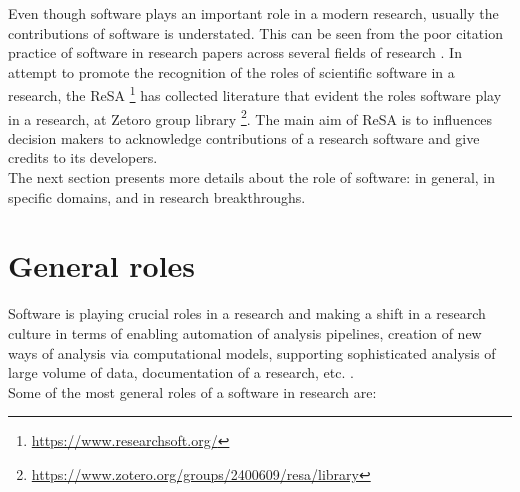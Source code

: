 Even though software plays an important role in a modern research, usually the contributions of software is understated. This can be seen from the poor citation practice of software in research papers across several fields of research \citep{schindler2021somesci,yang2018important, pan2016disciplinary}.  In attempt to promote the recognition of the roles of scientific software in a research, the \ac{ReSA} \footnote{\url{https://www.researchsoft.org/}} has collected literature that evident the roles software play in a research, at Zetoro group library \footnote{\url{https://www.zotero.org/groups/2400609/resa/library}}. The main aim of \ac{ReSA} is to influences decision makers to acknowledge contributions of a research software and give credits to its developers.\\

The next section presents more details about the role of software: in general, in specific domains, and in research breakthroughs.


\section{General roles}
\label{sec:Roles:Generalroles}

Software is playing crucial roles in a research and making a shift in a research culture in terms of  enabling automation of analysis pipelines, creation of new ways of analysis via computational models, supporting sophisticated analysis of large volume of data, documentation of a research, etc. \citep{jay2020software}. \\ 

\noindent Some of the most general roles of a software in research are:

